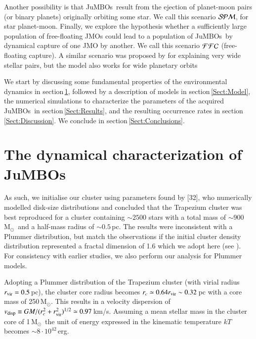 \documentclass[submission,phys]{lib/SciPost}
\newcommand{\MSun}{\mbox{$\mathrm{{M}}_\odot$}}
\newcommand{\jumbos}{\mbox{JuMBOs}}
\begin{document}
Another possibility is that \jumbos\, result from the ejection of planet-moon
pairs (or binary planets) originally orbiting some star.  We call this 
scenario ${\cal SPM}$, for star planet-moon.
Finally, we explore the hypothesis whether a sufficiently large
population of free-floating JMOs could lead to a
population of \jumbos\, by dynamical capture of one JMO by another.
We call this scenario ${\cal FFC}$ (free-floating capture). A similar
scenario was proposed by \cite{2010MNRAS.404.1835K} for explaining
very wide stellar pairs, but the model also works for
wide planetary orbits \cite{2012ApJ...750...83P,2018MNRAS.473.1589G}

We start by discussing some fundamental properties of the
environmental dynamics in section\,\ref{Sect:Characterize}, followed
by a description of models in section\,\ref{Sect:Model}, the numerical
simulations to characterize the parameters of the acquired \jumbos\,
in section\,\ref{Sect:Results}, and the resulting occurrence rates in
section\,\ref{Sect:Discussion}. We conclude in
section\,\ref{Sect:Conclusions}.

\section{The dynamical characterization of \jumbos}\label{Sect:Characterize}

As such, we initialise our cluster using parameters found by [32], who numerically 
modelled disk-size distributions and concluded that the Trapezium cluster was best 
reproduced for a cluster containing $\sim 2500$ stars with a total mass of 
$\sim 900$\,\MSun\, and a half-mass radius of $\sim 0.5$\,pc. The results were
inconsistent with a Plummer \cite{1911MNRAS..71..460P} distribution,
but match the observations if the initial cluster density distribution
represented a fractal dimension of 1.6 which we adopt here (see \cite{2004A&A...413..929G}).  
For consistency with earlier studies, we also perform our 
analysis for Plummer models.

Adopting a Plummer distribution of the Trapezium cluster (with virial
radius $r_{\rm vir} = 0.5$\,pc), the cluster core radius becomes $r_c \simeq
0.64r_{\rm vir} \sim 0.32$\,pc with a core mass of 250\,\MSun. This results 
in a velocity dispersion of $v_{\rm disp} \equiv GM/(r_c^2 +
r_{\rm vir}^2)^{1/2} \simeq 0.97$\,km/s. Assuming a mean stellar mass in
the cluster core of 1\,\MSun\, the unit of energy expressed in the
kinematic temperature $kT$ becomes $\sim 8 \cdot 10^{42}$\,erg.
\end{document}
